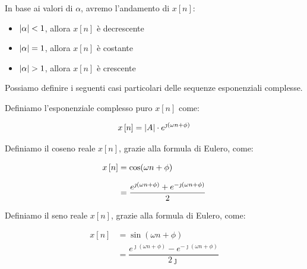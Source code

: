 In base ai valori di $\alpha$, 
avremo l'andamento di $x \left[ n \right]$: 

\begin{itemize}
    \item $\abs{\alpha} < 1 $, allora $x \left[ n \right]$ è decrescente 
    \item $\abs{\alpha} = 1 $, allora $x \left[ n \right]$ è costante 
    \item $\abs{\alpha} > 1 $, allora $x \left[ n \right]$ è crescente
\end{itemize}

Possiamo definire i seguenti casi particolari delle sequenze esponenziali complesse. \newline 

Definiamo l'esponenziale complesso puro $x \left[ n \right]$ come: 

{
    \Large 
    \begin{equation}
        x \left[ n \right]
        =
        \abs{A} \cdot e^{\jmath \left( \omega n + \phi\right)}
    \end{equation}
}

Definiamo il coseno reale $x \left[ n \right]$, 
grazie alla formula di Eulero, come: 

{
    \Large 
    \begin{equation}
        \setlength{\jot}{10pt} %
        \begin{split}
        x \left[ n \right]
        &=
        \cos(\omega n + \phi)
        \\
        &=
        \dfrac{e^{\jmath \left( \omega n + \phi\right)} + e^{-\jmath \left( \omega n + \phi\right)}}{2}
        \end{split}
    \end{equation}
}

Definiamo il seno reale $x \left[ n \right]$, 
grazie alla formula di Eulero, come: 

{
    \Large 
    \begin{equation}
        \begin{split}
        x \left[ n \right]
        &=
        \sin(\omega n + \phi)
        \\
        &=
        \dfrac{e^{\jmath \left( \omega n + \phi\right)} - e^{-\jmath \left( \omega n + \phi\right)}}{2 \jmath}
        \end{split}
    \end{equation}

}

